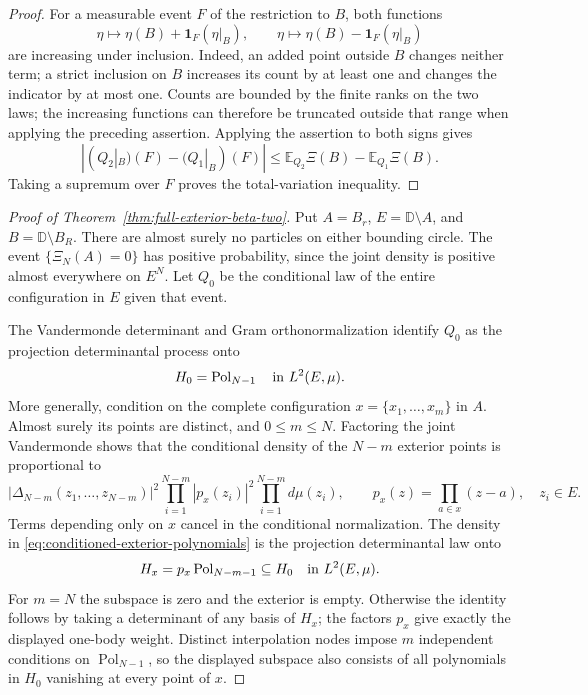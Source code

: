 \documentclass[11pt]{article}
\theoremstyle{remark}\newtheorem{remark}[theorem]{Remark}
\begin{document}
\begin{proof}
For a measurable event $F$ of the restriction to $B$, both functions
\[
 \eta\longmapsto\eta(B)+\mathbf1_F(\eta|_B),
 \qquad
 \eta\longmapsto\eta(B)-\mathbf1_F(\eta|_B)
\]
are increasing under inclusion.  Indeed, an added point outside $B$
changes neither term; a strict inclusion on $B$ increases its count
by at least one and changes the indicator by at most one.  Counts are
bounded by the finite ranks on the two laws; the increasing functions
can therefore be truncated outside that range when applying the
preceding assertion.  Applying the assertion to both signs gives
\[
 |(Q_2|_B)(F)-(Q_1|_B)(F)|
 \le\mathbb E_{Q_2}\Xi(B)-\mathbb E_{Q_1}\Xi(B).
\]
Taking a supremum over $F$ proves the total-variation inequality.
\end{proof}

\begin{proof}[Proof of Theorem~\ref{thm:full-exterior-beta-two}]
Put $A=B_r$, $E=\mathbb D\setminus A$, and $B=\mathbb D\setminus B_R$.
There are almost surely no particles on either bounding circle.  The
event $\{\Xi_N(A)=0\}$ has positive probability, since the joint density
is positive almost everywhere on $E^N$.  Let $Q_0$ be the conditional
law of the entire configuration in $E$ given that event.

The Vandermonde determinant and Gram orthonormalization identify $Q_0$
as the projection determinantal process onto
\[
 H_0=\operatorname{Pol}_{N-1}
       \quad\hbox{in }L^2(E,\mu).
\]
More generally, condition on the complete configuration
$x=\{x_1,\ldots,x_m\}$ in $A$.  Almost surely its points are distinct,
and $0\le m\le N$.  Factoring the joint Vandermonde shows that the
conditional density of the $N-m$ exterior points is proportional to
\begin{equation}\label{eq:conditioned-exterior-polynomials}
 |\Delta_{N-m}(z_1,\ldots,z_{N-m})|^2
   \prod_{i=1}^{N-m}|p_x(z_i)|^2\prod_{i=1}^{N-m}d\mu(z_i),
 \qquad p_x(z)=\prod_{a\in x}(z-a),\quad z_i\in E.
\end{equation}
Terms depending only on $x$ cancel in the conditional normalization.
The density in \eqref{eq:conditioned-exterior-polynomials} is the
projection determinantal law onto
\[
 H_x=p_x\operatorname{Pol}_{N-m-1}\subseteq H_0
             \quad\hbox{in }L^2(E,\mu).
\]
For $m=N$ the subspace is zero and the exterior is empty.  Otherwise
the identity follows by taking a determinant of any basis of $H_x$;
the factors $p_x$ give exactly the displayed one-body weight.
Distinct interpolation nodes impose $m$ independent conditions on
$\operatorname{Pol}_{N-1}$, so the displayed subspace also consists of
all polynomials in $H_0$ vanishing at every point of $x$.


\end{proof}
\end{document}
